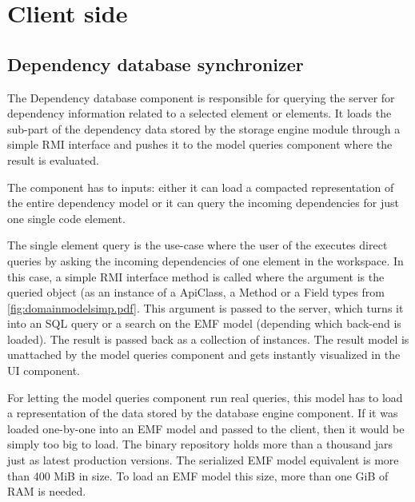 \section{Client side}


\subsection{Dependency database synchronizer}
\label{sect:depdbsynch}


The Dependency database component is responsible for querying the server for
dependency information related to a selected element or elements. It loads the
sub-part of the dependency data stored by the storage engine module through a
simple RMI interface and pushes it to the model queries component where the
result is evaluated.

The component has to inputs: either it can load a compacted representation of the 
entire dependency model or it can query the incoming dependencies for just one 
single code element. 

The single element query is the use-case where the user of the \ptool{} executes
direct queries by asking the incoming dependencies of one element in
the workspace. In this case, a simple RMI interface method is called where the
argument is the queried object (as an instance of a ApiClass, a Method or a
Field types from \autoref{fig:domainmodelsimp.pdf}. This argument is passed to
the server, which turns it into an SQL query or a search on the EMF model
(depending which back-end is loaded). The result is passed back as a collection
of  instances. The result model is unattached by the model
queries component and gets instantly visualized in the UI component.

For letting the model queries component run real queries, this model has to load
a representation of the data stored by the database engine component. If it was
loaded one-by-one into an EMF model and passed to the client, then it would be
simply too big to load. The binary repository holds more than a thousand jars
just as latest production versions. The serialized EMF model equivalent is more
than 400 MiB in size. To load an EMF model this size, more than one GiB  of
RAM is needed.

